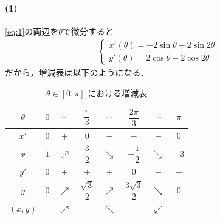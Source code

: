 \documentclass[../../main.tex]{subfiles}
\begin{document}
\paragraph{(1)}

\cref{eq:1}の両辺を$\theta$で微分すると
\begin{align}
  \begin{cases}
    x'(\theta) = -2\sin\theta + 2\sin 2\theta \\
    y'(\theta) = 2\cos\theta - 2\cos 2\theta
  \end{cases}
\end{align}
だから，増減表は以下のようになる．

\begin{table}[htb]
  \centering
  \caption{$\theta \in [0, \pi]$ における増減表}
  \label{tab:cardioid_variation}
  \begin{tabular}{|c|c|c|c|c|c|c|c|}
    \hline
    $\theta$ & $0$ & $\cdots$ & $\dfrac{\pi}{3}$ & $\cdots$ & $\dfrac{2\pi}{3}$ & $\cdots$ & $\pi$ \\
    \hline
    $x'$ & $0$ & $+$ & $0$ & $-$ & $-$ & $-$ & $0$ \\
    \hline
    $x$ & $1$ & $\nearrow$ & $\dfrac{3}{2}$ & $\searrow$ & $-\dfrac{1}{2}$ & $\searrow$ & $-3$ \\
    \hline
    $y'$ & $0$ & $+$ & $+$ & $+$ & $0$ & $-$ & $-$ \\
    \hline
    $y$ & $0$ & $\nearrow$ & $\dfrac{\sqrt{3}}{2}$ & $\nearrow$ & $\dfrac{3\sqrt{3}}{2}$ & $\searrow$ & $0$ \\
    \hline
    $(x,y)$ & & $\nearrow$ & & $\nwarrow$ & & $\swarrow$ & \\
    \hline
  \end{tabular}
\end{table}
\end{document}
